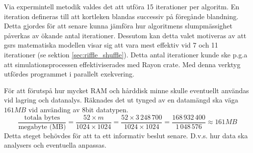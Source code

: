 \documentclass[swedish,a4paper]{article}
\begin{document}

Via expermintell metodik valdes det att utföra 15 iterationer
per algoritm. En iteration defineras till att kortleken blandas successiv på
föregånde blandning. Detta gjordes 
för att senare kunna jämföra hur algoritmens slumpmässighet påverkas av ökande 
antal iterationer. Dessutom kan detta valet motiveras av att \gls{gsr}s matematiska
modellen visar sig att vara mest effektiv vid 7 och 11 iterationer (se sektion
\ref{sec:riffle_shuffle}). Detta antal iterationer kunde
ske p.g.a att simulationsprocessen effektiviserades med Rayon \gls{crate}.
Med denna verktyg utfördes programmet i parallelt exekvering. 

För att förutspå hur mycket RAM och hårddisk minne  skulle eventuellt användas vid
lagring och datanalys. Räknades det ut tynged av en datamängd ska väga 
$161 MB$ vid använding av 8bit datatypen.
$$ \frac{\text{totala bytes}}{\text{megabyte (MB)}} = \frac{52 \times m }{1024 \times
1024} = \frac{52 \times 3\,248\,700}{1024 \times 1024} = \frac{168\,932\,400}{1\,048\,576} \approx 161 MB 
$$
Detta steget behövdes för att ta ett informativ beslut senare. D.v.s. hur data ska
analysers och eventuella anpassas.
\end{document}
